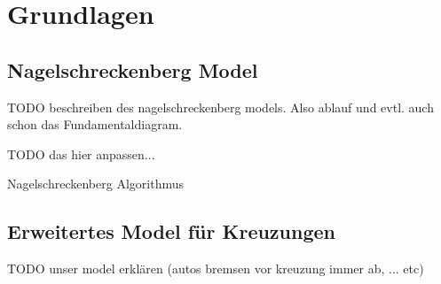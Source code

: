 \chapter{Grundlagen}

\section{Nagelschreckenberg Model}
TODO beschreiben des nagelschreckenberg models.
Also ablauf und evtl. auch schon das Fundamentaldiagram.

TODO das hier anpassen...

\begin{algorithm}[H]

 \caption{Nagelschreckenberg Algorithmus}
 \label{algo:nagelsberg}
\end{algorithm}

\section{Erweitertes Model für Kreuzungen}
TODO unser model erklären (autos bremsen vor kreuzung immer ab,
... etc)
